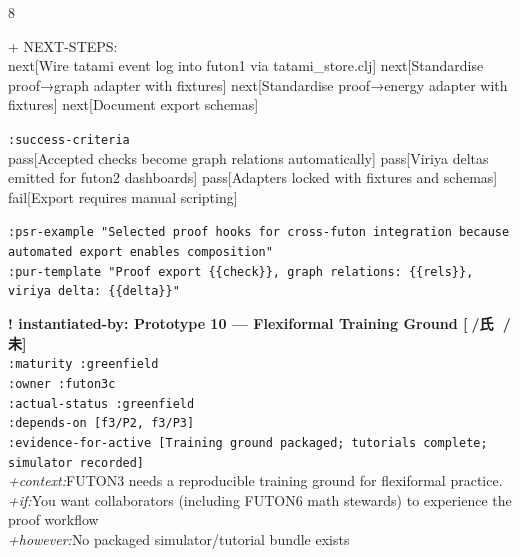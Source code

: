 \documentclass[landscape]{article}
\newcommand{\flexitag}[1]{\textcolor[gray]{0.35}{\textit{#1}}}
\newenvironment{devmapgreenfield}{%
  \def\FrameCommand{\colorbox{devmapgreenfieldbg}}%
  \setlength{\fboxsep}{2pt}%
  \MakeFramed{\advance\hsize-\width \FrameRestore}%
}{\endMakeFramed}
\begin{document}
\begin{paracol}{8}
\begin{devmapgreenfield}
\par
  + NEXT-STEPS:\\
    next[Wire tatami event log into futon1 via tatami\_store.clj] next[Standardise proof→graph adapter with fixtures] next[Standardise proof→energy adapter with fixtures] next[Document export schemas]\\
\par
  \texttt{:\allowbreak{}success-\allowbreak{}criteria}\\
    pass[Accepted checks become graph relations automatically] pass[Viriya deltas emitted for futon2 dashboards] pass[Adapters locked with fixtures and schemas] fail[Export requires manual scripting]\\
\par
  \texttt{:\allowbreak{}psr-\allowbreak{}example "Selected proof hooks for cross-\allowbreak{}futon integration because automated export enables composition"}\\
  \texttt{:\allowbreak{}pur-\allowbreak{}template "Proof export \{\{check\}\},\allowbreak{} graph relations:\allowbreak{} \{\{rels\}\},\allowbreak{} viriya delta:\allowbreak{} \{\{delta\}\}"}\\
\par
\par
\end{devmapgreenfield}
\begin{devmapgreenfield}
\textbf{! instantiated-by: Prototype 10 — Flexiformal Training Ground [🚢/氏 🚴/未]}\\
  \texttt{:\allowbreak{}maturity :\allowbreak{}greenfield}\\
  \texttt{:\allowbreak{}owner :\allowbreak{}futon3c}\\
  \texttt{:\allowbreak{}actual-\allowbreak{}status :\allowbreak{}greenfield}\\
  \texttt{:\allowbreak{}depends-\allowbreak{}on [f3/\allowbreak{}P2,\allowbreak{} f3/\allowbreak{}P3]}\\
  \texttt{:\allowbreak{}evidence-\allowbreak{}for-\allowbreak{}active [Training ground packaged;\allowbreak{} tutorials complete;\allowbreak{} simulator recorded]}\\
  \flexitag{+context:}FUTON3 needs a reproducible training ground for flexiformal practice.\\
  \flexitag{+if:}You want collaborators (including FUTON6 math stewards) to experience the proof workflow\\
  \flexitag{+however:}No packaged simulator/tutorial bundle exists\\

\end{devmapgreenfield}
\end{paracol}
\end{document}

